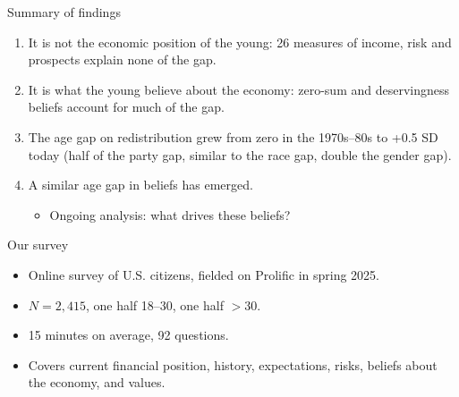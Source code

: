 \documentclass[aspectratio=169]{beamer}
\begin{document}
\begin{frame}{Summary of findings}

\begin{enumerate}
    \item It is not the economic position of the young: 26 measures of income, risk and prospects explain none of the gap.
    \item It is what the young believe about the economy: zero-sum and deservingness beliefs account for much of the gap.
    \item The age gap on redistribution grew from zero in the 1970s–80s to +0.5 SD today (half of the party gap, similar to the race gap, double the gender gap).
    \item A similar age gap in beliefs has emerged. 
    \begin{itemize}
        \item Ongoing analysis: what drives these beliefs?
    \end{itemize}
\end{enumerate}
\end{frame}



\begin{frame}{Our survey}
\begin{itemize}
    \item Online survey of U.S. citizens, fielded on Prolific in spring 2025.
    \item $N = 2,415$, one half 18--30, one half $>30$.
    \item 15 minutes on average, 92 questions.
    \item Covers current financial position, history, expectations, risks, beliefs about the economy, and values.
\end{itemize}
\end{frame}
\end{document}

